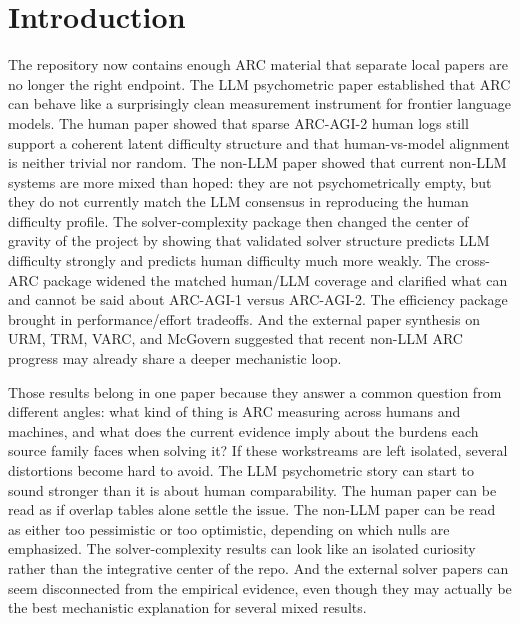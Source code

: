 \section{Introduction}

The repository now contains enough ARC material that separate local papers are no longer the right endpoint. The LLM psychometric paper established that ARC can behave like a surprisingly clean measurement instrument for frontier language models. The human paper showed that sparse ARC-AGI-2 human logs still support a coherent latent difficulty structure and that human-vs-model alignment is neither trivial nor random. The non-LLM paper showed that current non-LLM systems are more mixed than hoped: they are not psychometrically empty, but they do not currently match the LLM consensus in reproducing the human difficulty profile. The solver-complexity package then changed the center of gravity of the project by showing that validated solver structure predicts LLM difficulty strongly and predicts human difficulty much more weakly. The cross-ARC package widened the matched human/LLM coverage and clarified what can and cannot be said about ARC-AGI-1 versus ARC-AGI-2. The efficiency package brought in performance/effort tradeoffs. And the external paper synthesis on URM, TRM, VARC, and McGovern suggested that recent non-LLM ARC progress may already share a deeper mechanistic loop.

Those results belong in one paper because they answer a common question from different angles: what kind of thing is ARC measuring across humans and machines, and what does the current evidence imply about the burdens each source family faces when solving it? If these workstreams are left isolated, several distortions become hard to avoid. The LLM psychometric story can start to sound stronger than it is about human comparability. The human paper can be read as if overlap tables alone settle the issue. The non-LLM paper can be read as either too pessimistic or too optimistic, depending on which nulls are emphasized. The solver-complexity results can look like an isolated curiosity rather than the integrative center of the repo. And the external solver papers can seem disconnected from the empirical evidence, even though they may actually be the best mechanistic explanation for several mixed results.

